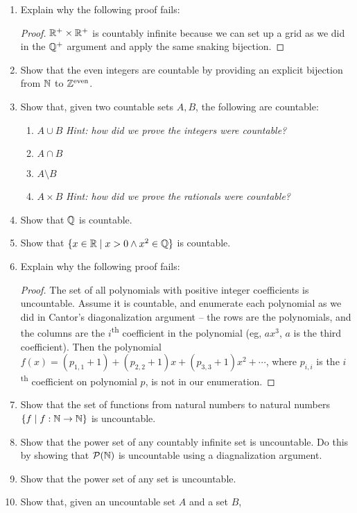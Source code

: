 \documentclass[main.tex]{subfiles}
\begin{document}
\begin{enumerate}
	\item Explain why the following proof fails:
	\begin{proof}
		\(\mathbb{R}^{+} \times \mathbb{R}^{+}\) is countably infinite because we can set up a grid as we did in the \(\mathbb{Q}^{+}\) argument and apply the same snaking bijection. \mbox{}
	\end{proof}
	\item Show that the even integers are countable by providing an explicit bijection from \(\mathbb{N}\) to \(\mathbb{Z}^{\text{even}}\).
	\item Show that, given two countable sets \(A,B\), the following are countable:
	\begin{enumerate}
		\item \(A \cup B\) \textit{Hint: how did we prove the integers were countable?}
		\item \(A \cap B\)
		\item \(A \setminus B\)
		\item \(A \times B\) \textit{Hint: how did we prove the rationals were countable?}
	\end{enumerate}
	\item Show that \(\mathbb{Q}\) is countable.
	\item Show that \(\{ x \in \mathbb{R} \mid x > 0 \land x^2 \in \mathbb{Q} \}\) is countable.
	\item Explain why the following proof fails:
	\begin{proof}
		The set of all polynomials with positive integer coefficients is uncountable. Assume it is countable, and enumerate each polynomial as we did in Cantor's diagonalization argument -- the rows are the polynomials, and the columns are the \(i\)\textsuperscript{th} coefficient in the polynomial (eg, \(ax^3\), \(a\) is the third coefficient). Then the polynomial \(f(x) = (p_{1,1}+1) + (p_{2,2}+1)x + (p_{3,3}+1)x^2 + \cdots\), where \(p_{i,i}\) is the \(i\)\textsuperscript{th} coefficient on polynomial \(p\), is not in our enumeration.
	\end{proof}
	\item Show that the set of functions from natural numbers to natural numbers \(\{ f \mid f : \mathbb{N} \rightarrow \mathbb{N} \}\) is uncountable.
	\item Show that the power set of any countably infinite set is uncountable. Do this by showing that \(\mathcal{P}(\mathbb{N})\) is uncountable using a diagnalization argument.
	\item Show that the power set of any set is uncountable.
	\item Show that, given an uncountable set \(A\) and a set \(B\),

\end{enumerate}
\end{document}

